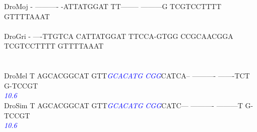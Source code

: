 \documentclass[11pt,twoside,reqno,a4paper]{article}
\begin{document}
{DroMoj	-	----------	-ATTATGGAT	TT--------	---------G	TCGTCCTTTT	GTTTTAAAT\\
\hspace*{7\charwidth}\hspace*{1\charwidth}\hspace*{1\charwidth}\hspace*{1\charwidth}\hspace*{1\charwidth}\hspace*{1\charwidth}\hspace*{1\charwidth}\\
DroGri	-	----TTGTCA	CATTATGGAT	TTCCA-GTGG	CCGCAACGGA	TCGTCCTTTT	GTTTTAAAT\\
\hspace*{7\charwidth}\hspace*{1\charwidth}\hspace*{1\charwidth}\hspace*{1\charwidth}\hspace*{1\charwidth}\hspace*{1\charwidth}\hspace*{1\charwidth}\\
\\
DroMel	T	AGCACGGCAT	GTT\textit{\textcolor{Blue}{G}}\textit{\textcolor{Blue}{C}}\textit{\textcolor{Blue}{A}}\textit{\textcolor{Blue}{C}}\textit{\textcolor{Blue}{A}}\textit{\textcolor{Blue}{T}}\textit{\textcolor{Blue}{G}}	\textit{\textcolor{Blue}{C}}\textit{\textcolor{Blue}{G}}\textit{\textcolor{Blue}{G}}CATCA--	----------	-------TCT	G-TCCGT\\
\hspace*{7\charwidth}\hspace*{1\charwidth}\hspace*{1\charwidth}\hspace*{14\charwidth}\textit{\textcolor{Blue}{10.6}}\hspace*{1\charwidth}\hspace*{1\charwidth}\hspace*{1\charwidth}\hspace*{1\charwidth}\\
DroSim	T	AGCACGGCAT	GTT\textit{\textcolor{Blue}{G}}\textit{\textcolor{Blue}{C}}\textit{\textcolor{Blue}{A}}\textit{\textcolor{Blue}{C}}\textit{\textcolor{Blue}{A}}\textit{\textcolor{Blue}{T}}\textit{\textcolor{Blue}{G}}	\textit{\textcolor{Blue}{C}}\textit{\textcolor{Blue}{G}}\textit{\textcolor{Blue}{G}}CATC---	----------	---------T	G-TCCGT\\
\hspace*{7\charwidth}\hspace*{1\charwidth}\hspace*{1\charwidth}\hspace*{14\charwidth}\textit{\textcolor{Blue}{10.6}}\hspace*{1\charwidth}\hspace*{1\charwidth}\hspace*{1\charwidth}\hspace*{1\charwidth}\\
}
\end{document}
